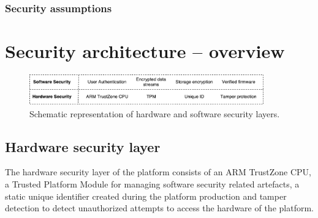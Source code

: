 \documentclass[10pt]{article}
\begin{document}

      \subsubsection{Security assumptions}

         \begin{itemize}[label={}]
         \end{itemize}

  \section{Security architecture -- overview}

    \begin{figure}[H]
      \center
      \includegraphics[width=0.9\textwidth]{input/security_layers.pdf}
      \caption{Schematic representation of hardware and software security layers.}
    \end{figure}

    \subsection{Hardware security layer}

      The hardware security layer of the platform consists of an ARM TrustZone
      CPU, a Trusted Platform Module for managing software security related
      artefacts, a static unique identifier created during the platform
      production and tamper detection to detect unauthorized attempts to
      access the hardware of the platform.
\end{document}
